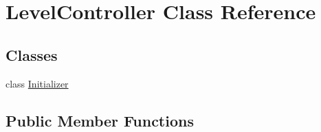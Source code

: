 \hypertarget{class_level_controller}{\section{Level\+Controller Class Reference}
\label{class_level_controller}
}
\subsection*{Classes}
\begin{DoxyCompactItemize}
\item 
class \hyperlink{class_level_controller_1_1_initializer}{Initializer}
\end{DoxyCompactItemize}
\subsection*{Public Member Functions}
